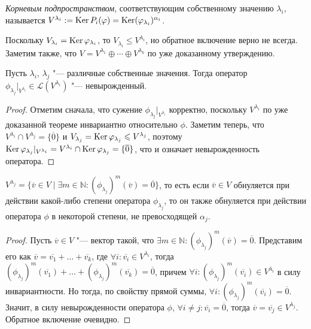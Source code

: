\begin{definition}
	\textit{Корневым подпространством}, соответствующим собственному значению $\lambda_i$, называется $V^{\lambda_i} := \ke{P_i(\phi)} \hm{=} \ke(\phi_{\lambda_i})^{\alpha_i}$.
\end{definition}

\begin{note}
	Поскольку $V_{\lambda_i} = \operatorname{Ker}{\varphi_{\lambda_i}}$, то $V_{\lambda_i} \le V^{\lambda_i}$, но обратное включение верно не всегда. Заметим также, что $V = V^{\lambda_1} \oplus \dotsb \oplus V^{\lambda_k}$ по уже доказанному утверждению.
\end{note}

\begin{proposition}
	Пусть $\lambda_i$, $\lambda_j$ "--- различные собственные значения. Тогда оператор $\phi_{\lambda_j}|_{V^{\lambda_i}} \in \mathcal{L}(V^{\lambda_i})$ "--- невырожденный.
\end{proposition}

\begin{proof}
	Отметим сначала, что сужение $\phi_{\lambda_j}|_{V^{\lambda_i}}$ корректно, поскольку $V^{\lambda_i}$ по уже доказанной теореме инвариантно относительно $\phi$. Заметим теперь, что $V^{\lambda_i} \cap V^{\lambda_j} = \{\overline{0}\}$ и $V_{\lambda_j} = \operatorname{Ker}{\varphi_{\lambda_j}} \leqslant V^{\lambda_j}$, поэтому $\ke{\phi_{\lambda_j}|_{V^{\lambda_i}}} = V^{\lambda_i} \cap \ke{\phi_{\lambda_j}} \hm{=} \{\overline{0}\}$, что и означает невырожденность оператора.
\end{proof}

\begin{proposition}
	$V^{\lambda_j} = \{\overline{v} \in V\mid \exists m \in \mathbb{N}: (\phi_{\lambda_j})^m(\overline{v}) = \overline{0}\}$, то есть если $\overline{v} \in V$ обнуляется при действии какой-либо степени оператора $\phi_{\lambda_j}$, то он также обнуляется при действии оператора $\phi$ в некоторой степени, не превосходящей $\alpha_j$.
\end{proposition}

\begin{proof}
	Пусть $\overline{v} \in V$ "--- вектор такой, что $\exists m \in \mathbb{N}: (\phi_{\lambda_j})^m(\overline{v}) = \overline{0}$. Представим его как $\overline{v} = \overline{v_1} + \dots + \overline{v_k}$, где $ \forall i: \overline{v_i} \in V^{\lambda_i}$, тогда $(\phi_{\lambda_j})^m(\overline{v_1}) + \dots +  (\phi_{\lambda_j})^m(\overline{v_k}) = \overline{0}$, причем $ \forall i: (\phi_{\lambda_j})^m(\overline{v_i}) \in V^{\lambda_i}$ в силу инвариантности. Но тогда, по свойству прямой суммы, $\forall i: (\phi_{\lambda_j})^m(\overline{v_i}) = \overline{0}$. Значит, в силу невырожденности оператора $\phi$, $\forall i \ne j: \overline{v_i} = \overline{0}$, тогда $\overline{v} = \overline{v_j} \in V^{\lambda_j}$. Обратное включение очевидно.
\end{proof}

